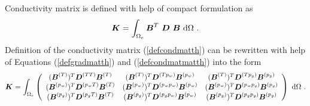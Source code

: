 \documentclass[12pt]{book}
\newcommand{\mbf}[1]{\mbox{\boldmath$#1$}}
\begin{document}
Conductivity matrix is defined with help of compact formulation as
\begin{equation}\label{defcondmatth}
\mbf{K} = \int_{\Omega_e} \mbf{B}^T\ \mbf{D}\ \mbf{B}\ {\rm d}\Omega\ .
\end{equation}
Definition of the conductivity matrix (\ref{defcondmatth}) can be rewritten with help of
Equations (\ref{defgradmatth}) and (\ref{defcondmatmatth}) into the form
\begin{equation}
\mbf{K} = \int_{\Omega_e}
\left(\begin{array}{ccc}
(\mbf{B}^{(T)})^T \mbf{D}^{(TT)} \mbf{B}^{(T)}         & (\mbf{B}^{(T)})^T \mbf{D}^{(Tp_w)} \mbf{B}^{(p_w)} &
(\mbf{B}^{(T)})^T \mbf{D}^{(Tp_g)} \mbf{B}^{(p_g)}
\\
(\mbf{B}^{(p_w)})^T \mbf{D}^{(p_wT)} \mbf{B}^{(T)}     & (\mbf{B}^{(p_w)})^T \mbf{D}^{(p_wp_w)} \mbf{B}^{(p_w)} &
(\mbf{B}^{(p_w)})^T \mbf{D}^{(p_wp_g)} \mbf{B}^{(p_g)}
\\
(\mbf{B}^{(p_g)})^T \mbf{D}^{(p_gT)} \mbf{B}^{(T)}     & (\mbf{B}^{(p_g)})^T \mbf{D}^{(p_gp_w)} \mbf{B}^{(p_w)} &
(\mbf{B}^{(p_g)})^T \mbf{D}^{(p_gp_g)} \mbf{B}^{(p_g)}
\\
\end{array}\right)\ {\rm d}\Omega\ .
\end{equation}



\printindex
\end{document}
